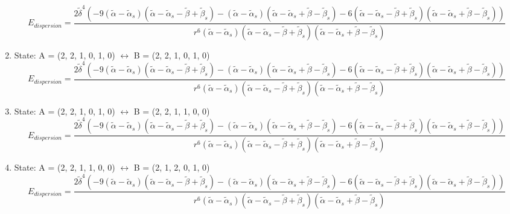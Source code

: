 \documentclass[12pt,a4paper]{article}
\begin{document}
\begin{enumerate}
$$E_{dispersion} =\frac{2 \tilde{\delta}^{4} \left(- 9 \left(\tilde{\alpha} - \tilde{\alpha}_{s}\right) \left(\tilde{\alpha} - \tilde{\alpha}_{s} - \tilde{\beta} + \tilde{\beta}_{s}\right) - \left(\tilde{\alpha} - \tilde{\alpha}_{s}\right) \left(\tilde{\alpha} - \tilde{\alpha}_{s} + \tilde{\beta} - \tilde{\beta}_{s}\right) - 6 \left(\tilde{\alpha} - \tilde{\alpha}_{s} - \tilde{\beta} + \tilde{\beta}_{s}\right) \left(\tilde{\alpha} - \tilde{\alpha}_{s} + \tilde{\beta} - \tilde{\beta}_{s}\right)\right)}{r^{6} \left(\tilde{\alpha} - \tilde{\alpha}_{s}\right) \left(\tilde{\alpha} - \tilde{\alpha}_{s} - \tilde{\beta} + \tilde{\beta}_{s}\right) \left(\tilde{\alpha} - \tilde{\alpha}_{s} + \tilde{\beta} - \tilde{\beta}_{s}\right)}$$
 \item State: A = (2, 2, 1, 0, 1, 0) $\leftrightarrow$ B = (2, 2, 1, 0, 1, 0) 
$$E_{dispersion} =\frac{2 \tilde{\delta}^{4} \left(- 9 \left(\tilde{\alpha} - \tilde{\alpha}_{s}\right) \left(\tilde{\alpha} - \tilde{\alpha}_{s} - \tilde{\beta} + \tilde{\beta}_{s}\right) - \left(\tilde{\alpha} - \tilde{\alpha}_{s}\right) \left(\tilde{\alpha} - \tilde{\alpha}_{s} + \tilde{\beta} - \tilde{\beta}_{s}\right) - 6 \left(\tilde{\alpha} - \tilde{\alpha}_{s} - \tilde{\beta} + \tilde{\beta}_{s}\right) \left(\tilde{\alpha} - \tilde{\alpha}_{s} + \tilde{\beta} - \tilde{\beta}_{s}\right)\right)}{r^{6} \left(\tilde{\alpha} - \tilde{\alpha}_{s}\right) \left(\tilde{\alpha} - \tilde{\alpha}_{s} - \tilde{\beta} + \tilde{\beta}_{s}\right) \left(\tilde{\alpha} - \tilde{\alpha}_{s} + \tilde{\beta} - \tilde{\beta}_{s}\right)}$$
 \item State: A = (2, 2, 1, 0, 1, 0) $\leftrightarrow$ B = (2, 2, 1, 1, 0, 0) 
$$E_{dispersion} =\frac{2 \tilde{\delta}^{4} \left(- 9 \left(\tilde{\alpha} - \tilde{\alpha}_{s}\right) \left(\tilde{\alpha} - \tilde{\alpha}_{s} - \tilde{\beta} + \tilde{\beta}_{s}\right) - \left(\tilde{\alpha} - \tilde{\alpha}_{s}\right) \left(\tilde{\alpha} - \tilde{\alpha}_{s} + \tilde{\beta} - \tilde{\beta}_{s}\right) - 6 \left(\tilde{\alpha} - \tilde{\alpha}_{s} - \tilde{\beta} + \tilde{\beta}_{s}\right) \left(\tilde{\alpha} - \tilde{\alpha}_{s} + \tilde{\beta} - \tilde{\beta}_{s}\right)\right)}{r^{6} \left(\tilde{\alpha} - \tilde{\alpha}_{s}\right) \left(\tilde{\alpha} - \tilde{\alpha}_{s} - \tilde{\beta} + \tilde{\beta}_{s}\right) \left(\tilde{\alpha} - \tilde{\alpha}_{s} + \tilde{\beta} - \tilde{\beta}_{s}\right)}$$
 \item State: A = (2, 2, 1, 1, 0, 0) $\leftrightarrow$ B = (2, 1, 2, 0, 1, 0) 
$$E_{dispersion} =\frac{2 \tilde{\delta}^{4} \left(- 9 \left(\tilde{\alpha} - \tilde{\alpha}_{s}\right) \left(\tilde{\alpha} - \tilde{\alpha}_{s} - \tilde{\beta} + \tilde{\beta}_{s}\right) - \left(\tilde{\alpha} - \tilde{\alpha}_{s}\right) \left(\tilde{\alpha} - \tilde{\alpha}_{s} + \tilde{\beta} - \tilde{\beta}_{s}\right) - 6 \left(\tilde{\alpha} - \tilde{\alpha}_{s} - \tilde{\beta} + \tilde{\beta}_{s}\right) \left(\tilde{\alpha} - \tilde{\alpha}_{s} + \tilde{\beta} - \tilde{\beta}_{s}\right)\right)}{r^{6} \left(\tilde{\alpha} - \tilde{\alpha}_{s}\right) \left(\tilde{\alpha} - \tilde{\alpha}_{s} - \tilde{\beta} + \tilde{\beta}_{s}\right) \left(\tilde{\alpha} - \tilde{\alpha}_{s} + \tilde{\beta} - \tilde{\beta}_{s}\right)}$$

\end{enumerate}
\end{document}
